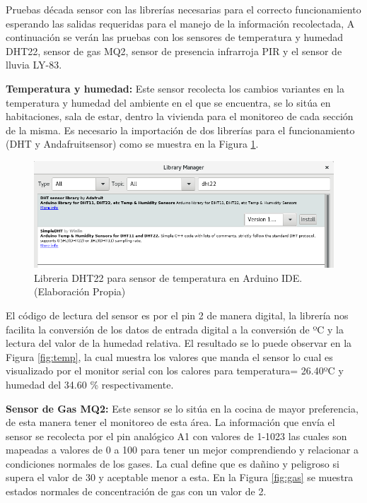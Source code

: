 \documentclass[11pt,letterpaper]{report}
\begin{document}
		Pruebas década sensor  con las  librerías necesarias para el correcto funcionamiento esperando las salidas requeridas para el manejo de la información recolectada, A continuación se verán las pruebas con los sensores de temperatura y humedad DHT22, sensor de gas MQ2, sensor de presencia infrarroja PIR y el sensor de lluvia LY-83.
		
		\textbf{Temperatura y humedad:} Este sensor recolecta los cambios variantes en la temperatura y humedad del ambiente en el que se encuentra, se lo sitúa en habitaciones, sala de estar, dentro la vivienda para el monitoreo de cada sección de la misma. Es necesario la importación de dos librerías para el funcionamiento (DHT y Andafruitsensor) como se muestra en la Figura \ref{libsArduino}.
		\begin{figure}[ht]
		\centering
		\includegraphics[scale=0.45]{imagenes/libsArduino.png}
		\caption{Libreria DHT22 para sensor de temperatura en Arduino IDE. (Elaboración Propia)}
		\label{libsArduino} 
		\end{figure}
		El código de lectura del sensor es por el pin 2 de manera digital, la librería nos facilita la conversión de los datos de entrada digital a la conversión de ºC y la lectura del valor de la humedad relativa. El resultado se lo puede observar en la Figura \ref{fig:temp}, la cual  muestra los valores que manda el sensor lo cual es visualizado por el monitor serial con los calores para temperatura= 26.40ºC y humedad del 34.60 \% respectivamente.
		
		\textbf{Sensor de Gas MQ2:} Este sensor se lo sitúa en la cocina de mayor preferencia, de esta manera tener el monitoreo de esta área. La información que envía el sensor se recolecta  por el pin analógico A1 con valores de 1-1023 las cuales son mapeadas a valores de 0 a 100 para tener un mejor comprendiendo y relacionar a condiciones normales de los gases. La  cual define  que es dañino y peligroso si supera el valor de 30 y aceptable menor a esta.  En la Figura \ref{fig:gas} se muestra estados normales de concentración de gas con un valor de 2.
		
\end{document}
